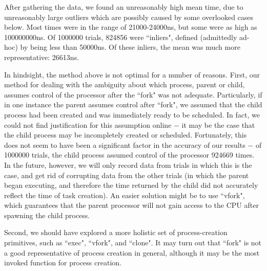 After gathering the data, we found an unreasonably high mean time, due to unreasonably large outliers which are possibly caused by some overlooked cases below. Most times were in the range of 21000-24000ns, but some were as high as 100000000ns. Of 1000000 trials, 824856 were ``inliers", defined (admittedly ad-hoc) by being less than 50000ns. Of these inliers, the mean was much more representative: 26613ns.

In hindsight, the method above is not optimal for a number of reasons. First, our method for dealing with the ambiguity about which process, parent or child, assumes control of the processor after the ``fork" was not adequate. Particularly, if in one instance the parent assumes control after ``fork", we assumed that the child process had been created and was immediately ready to be scheduled. In fact, we could not find justification for this assumption online $-$ it may be the case that the child process may be incompletely created or scheduled. Fortunately, this does not seem to have been a significant factor in the accuracy of our results $-$ of 1000000 trials, the child process assumed control of the processor 924669 times. In the future, however, we will only record data from trials in which this is the case, and get rid of corrupting data from the other trials (in which the parent began executing, and therefore the time returned by the child did not accurately reflect the time of task creation). An easier solution might be to use ``vfork", which guarantees that the parent processor will not gain access to the CPU after spawning the child process.

Second, we should have explored a more holistic set of process-creation primitives, such as ``exec", ``vfork", and ``clone". It may turn out that ``fork" is not a good representative of process creation in general, although it may be the most invoked function for process creation.